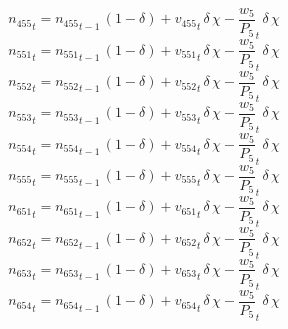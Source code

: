 \begin{dmath}
{{n_{455}}}_{t}={{n_{455}}}_{t-1}\, \left(1-{{\delta}}\right)+{{v_{455}}}_{t}\, {{\delta}}\, {{\chi}}-{{\frac{w_{5}}{P_{5}}}}_{t}\, {{\delta}}\, {{\chi}}
\end{dmath}
\begin{dmath}
{{n_{551}}}_{t}={{n_{551}}}_{t-1}\, \left(1-{{\delta}}\right)+{{v_{551}}}_{t}\, {{\delta}}\, {{\chi}}-{{\frac{w_{5}}{P_{5}}}}_{t}\, {{\delta}}\, {{\chi}}
\end{dmath}
\begin{dmath}
{{n_{552}}}_{t}={{n_{552}}}_{t-1}\, \left(1-{{\delta}}\right)+{{v_{552}}}_{t}\, {{\delta}}\, {{\chi}}-{{\frac{w_{5}}{P_{5}}}}_{t}\, {{\delta}}\, {{\chi}}
\end{dmath}
\begin{dmath}
{{n_{553}}}_{t}={{n_{553}}}_{t-1}\, \left(1-{{\delta}}\right)+{{v_{553}}}_{t}\, {{\delta}}\, {{\chi}}-{{\frac{w_{5}}{P_{5}}}}_{t}\, {{\delta}}\, {{\chi}}
\end{dmath}
\begin{dmath}
{{n_{554}}}_{t}={{n_{554}}}_{t-1}\, \left(1-{{\delta}}\right)+{{v_{554}}}_{t}\, {{\delta}}\, {{\chi}}-{{\frac{w_{5}}{P_{5}}}}_{t}\, {{\delta}}\, {{\chi}}
\end{dmath}
\begin{dmath}
{{n_{555}}}_{t}={{n_{555}}}_{t-1}\, \left(1-{{\delta}}\right)+{{v_{555}}}_{t}\, {{\delta}}\, {{\chi}}-{{\frac{w_{5}}{P_{5}}}}_{t}\, {{\delta}}\, {{\chi}}
\end{dmath}
\begin{dmath}
{{n_{651}}}_{t}={{n_{651}}}_{t-1}\, \left(1-{{\delta}}\right)+{{v_{651}}}_{t}\, {{\delta}}\, {{\chi}}-{{\frac{w_{5}}{P_{5}}}}_{t}\, {{\delta}}\, {{\chi}}
\end{dmath}
\begin{dmath}
{{n_{652}}}_{t}={{n_{652}}}_{t-1}\, \left(1-{{\delta}}\right)+{{v_{652}}}_{t}\, {{\delta}}\, {{\chi}}-{{\frac{w_{5}}{P_{5}}}}_{t}\, {{\delta}}\, {{\chi}}
\end{dmath}
\begin{dmath}
{{n_{653}}}_{t}={{n_{653}}}_{t-1}\, \left(1-{{\delta}}\right)+{{v_{653}}}_{t}\, {{\delta}}\, {{\chi}}-{{\frac{w_{5}}{P_{5}}}}_{t}\, {{\delta}}\, {{\chi}}
\end{dmath}
\begin{dmath}
{{n_{654}}}_{t}={{n_{654}}}_{t-1}\, \left(1-{{\delta}}\right)+{{v_{654}}}_{t}\, {{\delta}}\, {{\chi}}-{{\frac{w_{5}}{P_{5}}}}_{t}\, {{\delta}}\, {{\chi}}
\end{dmath}
